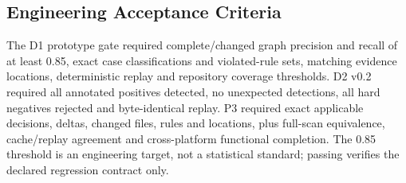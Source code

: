 \subsection{Engineering Acceptance Criteria}

The D1 prototype gate required complete/changed graph precision and recall of at least 0.85, exact case classifications and violated-rule sets, matching evidence locations, deterministic replay and repository coverage thresholds. D2 v0.2 required all annotated positives detected, no unexpected detections, all hard negatives rejected and byte-identical replay. P3 required exact applicable decisions, deltas, changed files, rules and locations, plus full-scan equivalence, cache/replay agreement and cross-platform functional completion. The 0.85 threshold is an engineering target, not a statistical standard; passing verifies the declared regression contract only.
